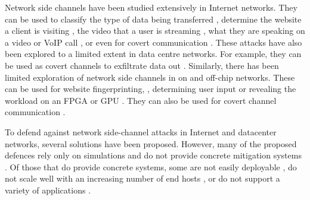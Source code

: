 Network side channels have been studied extensively in Internet networks.
They can be used to classify the type of data being transferred \cite{shapira2019flowpic}, determine the website a client is visiting \cite{bhat2019varcnn, dyer2012peek, hayes2016kfp, sirinam2018df}, the video that a user is streaming \cite{schuster2017beautyburst}, what they are speaking on a video or VoIP call \cite{white2011phonotactic}, or even for covert communication \cite{barradas2020poking}.
These attacks have also been explored to a limited extent in data centre networks.
For example, they can be used as covert channels to exfiltrate data out \cite{tahir2016sneak}.
Similarly, there has been limited exploration of network side channels in on and off-chip networks. 
These can be used for website fingerprinting, \cite{tan2021invisible, side2022lockeddown}, determining user input \cite{tan2021invisible, rodrigues2024busted} or revealing the workload on an FPGA or GPU \cite{tan2021invisible, giechaskiel2022cross, fang2023gotcha}.
They can also be used for covert channel communication \cite{khaliq2021timing, giechaskiel2022cross, side2022lockeddown, dutta2023spy}.

To defend against network side-channel attacks in Internet and datacenter networks, several solutions have been proposed. 
However, many of the proposed defences rely only on simulations and do not provide concrete mitigation systems \cite{abusnaina2020dfd, cai2014tamaraw, gong2022surakav, hou2020wf, juarez2016wtfpad, nasr2021blind, rahman2020mockingbird, shan2021dolos, wang2014supersequence, wright2009morphing}.
Of those that do provide concrete systems, some are not easily deployable \cite{cai2014csbuflo, mehta2022pacer, smith2022qcsd, wang2017walkie}, do not scale well with an increasing number of end hosts \cite{luo2011httpos, cai2014csbuflo, smith2022qcsd, wang2017walkie, cherubin2017llama, barradas2017deltashaper}, or do not support a variety of applications \cite{luo2011httpos, wang2017walkie, cherubin2017llama}.

